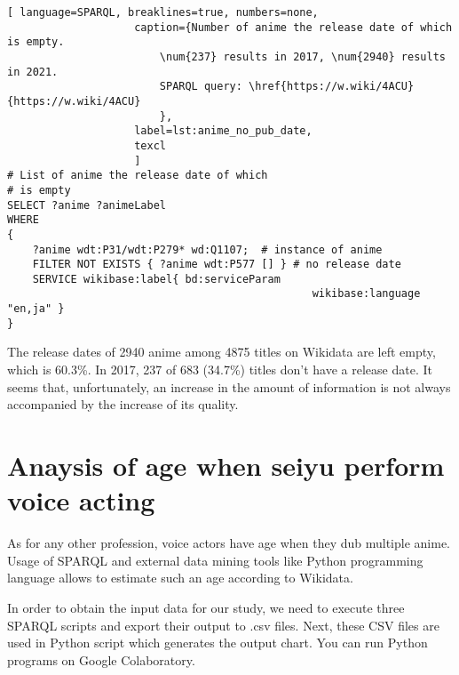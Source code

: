\begin{lstlisting}[ language=SPARQL, breaklines=true, numbers=none,
                    caption={Number of anime the release date of which is empty.
                        \num{237} results in 2017, \num{2940} results in 2021.
                        SPARQL query: \href{https://w.wiki/4ACU}{https://w.wiki/4ACU}
                        },
                    label=lst:anime_no_pub_date,
                    texcl 
                    ]
# List of anime the release date of which
# is empty
SELECT ?anime ?animeLabel
WHERE
{
    ?anime wdt:P31/wdt:P279* wd:Q1107;  # instance of anime
    FILTER NOT EXISTS { ?anime wdt:P577 [] } # no release date
    SERVICE wikibase:label{ bd:serviceParam
			  									wikibase:language "en,ja" }
}
\end{lstlisting}%

The release dates of \num{2940} anime among \num{4875} titles on Wikidata are left empty, which is \num{60.3}\%. In 2017, \num{237} of \num{683} (\num{34.7}\%) titles don't have a release date. It seems that, unfortunately, an increase in the amount of information is not always accompanied by the increase of its quality.

\section{Anaysis of age when seiyu perform voice acting}

As for any other profession, voice actors have age when they dub multiple anime. Usage of SPARQL and external data mining tools like Python programming language allows to estimate such an age according to Wikidata.

In order to obtain the input data for our study, we need to execute three SPARQL scripts and export their output to .csv files. Next, these CSV files are used in Python script which generates the output chart. You can run Python programs on Google Colaboratory.

